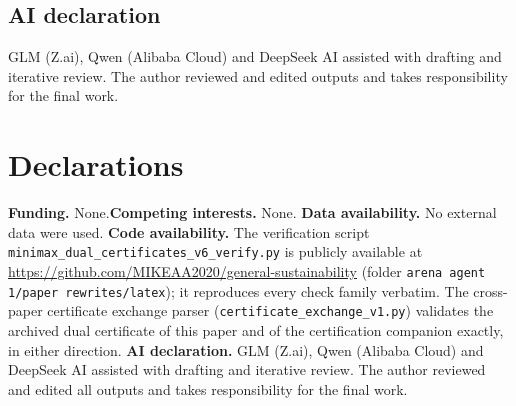 \documentclass[10pt,twocolumn]{article}
\theoremstyle{plain}
\theoremstyle{definition}
\theoremstyle{remark}
\begin{document}
\subsection*{AI declaration}
GLM (Z.ai), Qwen (Alibaba Cloud) and DeepSeek AI assisted with drafting
and iterative review. The author reviewed and edited outputs and takes
responsibility for the final work.
\section*{Declarations}
\textbf{Funding.} None.\quad \textbf{Competing interests.} None.\quad
\textbf{Data availability.} No external data were used.\quad
\textbf{Code availability.} The verification script
\texttt{minimax\_dual\_certificates\_v6\_verify.py} is publicly available
at \url{https://github.com/MIKEAA2020/general-sustainability} (folder
\texttt{arena agent 1/paper rewrites/latex}); it reproduces every check family verbatim. The cross-paper certificate
exchange parser (\texttt{certificate\_exchange\_v1.py}) validates the
archived dual certificate of this paper and of the certification companion
exactly, in either direction.\quad
\textbf{AI declaration.} GLM (Z.ai), Qwen (Alibaba Cloud) and DeepSeek AI
assisted with drafting and iterative review. The author reviewed and
edited all outputs and takes responsibility for the final work.
\end{document}
